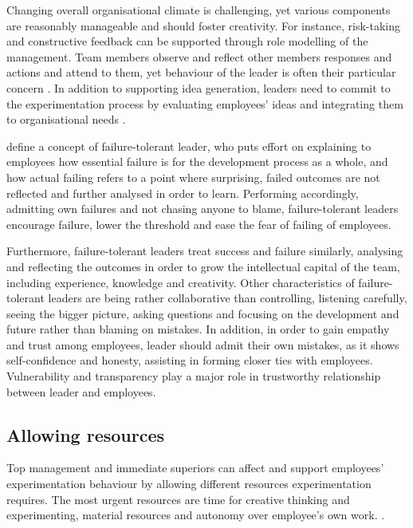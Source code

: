 Changing overall organisational climate is challenging, yet various components are reasonably manageable and should foster creativity. For instance, risk-taking and constructive feedback can be supported through role modelling of the management. \citep{shalley2004leaders} Team members observe and reflect other members responses and actions and attend to them, yet behaviour of the leader is often their particular concern \citep{tyler1992relational}. In addition to supporting idea generation, leaders need to commit to the experimentation process by evaluating employees' ideas and integrating them to organisational needs \citep{mumford2002leading}.

\citet{farson2002failuretolerantleader} define a concept of failure-tolerant leader, who puts effort on explaining to employees how essential failure is for the development process as a whole, and how actual failing refers to a point where surprising, failed outcomes are not reflected and further analysed in order to learn. Performing accordingly, admitting own failures and not chasing anyone to blame, failure-tolerant leaders encourage failure, lower the threshold and ease the fear of failing of employees. \citep{farson2002failuretolerantleader}

Furthermore, failure-tolerant leaders treat success and failure similarly, analysing and reflecting the outcomes in order to grow the intellectual capital of the team, including experience, knowledge and creativity. Other characteristics of failure-tolerant leaders are being rather collaborative than controlling, listening carefully, seeing the bigger picture, asking questions and focusing on the development and future rather than blaming on mistakes. In addition, in order to gain empathy and trust among employees, leader should admit their own mistakes, as it shows self-confidence and honesty, assisting in forming closer ties with employees. Vulnerability and transparency play a major role in trustworthy relationship between leader and employees.  \citep{farson2002failuretolerantleader}

\subsection{Allowing resources}
Top management and immediate superiors can affect and support employees' experimentation behaviour by allowing different resources experimentation requires. The most urgent resources are time for creative thinking and experimenting, material resources and autonomy over employee's own work. \citet{amabile2008creativity,katz1985project}. 

